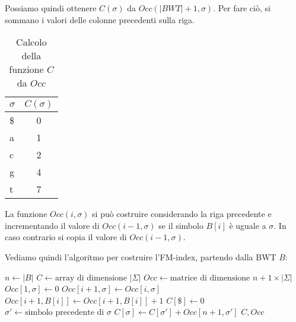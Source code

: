 \begin{esempio}
    Possiamo quindi ottenere $C(\sigma)$ da $Occ(|BWT| + 1,\sigma)$. Per fare ciò,
    si sommano i valori delle colonne precedenti sulla riga.
    \begin{table}[!ht]
        \centering
        \begin{tabular}{|l|c|}
            \hline
            \rowcolor[HTML]{EFEFEF}
            \textbf{$\sigma$} & \textbf{$C(\sigma)$} \\ \hline
            \$                & 0                    \\ \hline
            a                 & 1                    \\ \hline
            c                 & 2                    \\ \hline
            g                 & 4                    \\ \hline
            t                 & 7                    \\ \hline
        \end{tabular}
        \caption{Calcolo della funzione $C$ da $Occ$}
    \end{table}
\end{esempio}
La funzione $Occ(i, \sigma)$ si può costruire considerando la riga precedente e
incrementando il valore di $Occ(i - 1, \sigma)$ se il simbolo $B[i]$ è uguale a
$\sigma$. In caso contrario si copia il valore di $Occ(i - 1, \sigma)$.

Vediamo quindi l'algoritmo per costruire l'FM-index, partendo dalla BWT $B$:
\begin{algorithm}
    \begin{algorithmic}
        \State $n \gets |B|$
        \State $C \gets \text{array di dimensione } |\Sigma|$
        \State $Occ \gets \text{matrice di dimensione } n + 1 \times |\Sigma|$
        \For{$\sigma \in \Sigma$}
        \State $Occ[1, \sigma] \gets 0$
        \EndFor
        \State $Occ[i + 1, \sigma] \gets Occ[i, \sigma]$
        \EndFor
        \State $Occ[i + 1, B[i]] \gets Occ[i + 1, B[i]] + 1$
        \EndFor
        \State $C[\$] \gets 0$
        \State $\sigma' \gets \text{simbolo precedente di } \sigma$
        \State $C[\sigma] \gets C[\sigma'] + Occ[n + 1, \sigma']$
        \EndFor
        \State \Return $C, Occ$
        \EndFunction
    \end{algorithmic}
\end{algorithm}

